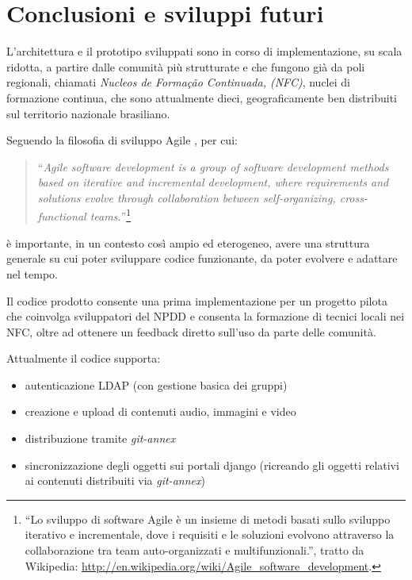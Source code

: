 
\chapter{Conclusioni e sviluppi futuri}
\label{Capitolo5}

L'architettura e il prototipo sviluppati sono in corso di
implementazione, su scala ridotta, a partire dalle comunità più
strutturate e che fungono già da poli regionali, chiamati
\emph{Nucleos de Formação Continuada, (NFC)}, nuclei di formazione
continua, che sono attualmente dieci, geograficamente ben distribuiti
sul territorio nazionale brasiliano.

Seguendo la filosofia di sviluppo Agile \citep{Agile}, per cui: 

\begin{quote}
  ``\emph{Agile software development is a group of software
    development methods based on iterative and incremental
    development, where requirements and solutions evolve through
    collaboration between self-organizing, cross-functional
    teams.}''\footnote{``Lo sviluppo di software Agile è un insieme di
    metodi basati sullo sviluppo iterativo e incrementale, dove i
    requisiti e le soluzioni evolvono attraverso la collaborazione tra
    team auto-organizzati e multifunzionali.'', tratto da Wikipedia:
    \url{http://en.wikipedia.org/wiki/Agile_software_development}.}
\end{quote}

è importante, in un contesto così ampio ed eterogeneo, avere una
struttura generale su cui poter sviluppare codice funzionante, da
poter evolvere e adattare nel tempo.

Il codice prodotto consente una prima implementazione per un progetto
pilota che coinvolga sviluppatori del NPDD e consenta la formazione di
tecnici locali nei NFC, oltre ad ottenere un feedback diretto sull'uso
da parte delle comunità.

Attualmente il codice supporta:
\begin{itemize}
\item autenticazione LDAP (con gestione basica dei gruppi)
\item creazione e upload di contenuti audio, immagini e video
\item distribuzione tramite \emph{git-annex}
\item sincronizzazione degli oggetti sui portali django (ricreando gli
  oggetti relativi ai contenuti distribuiti via \emph{git-annex})
\end{itemize}

